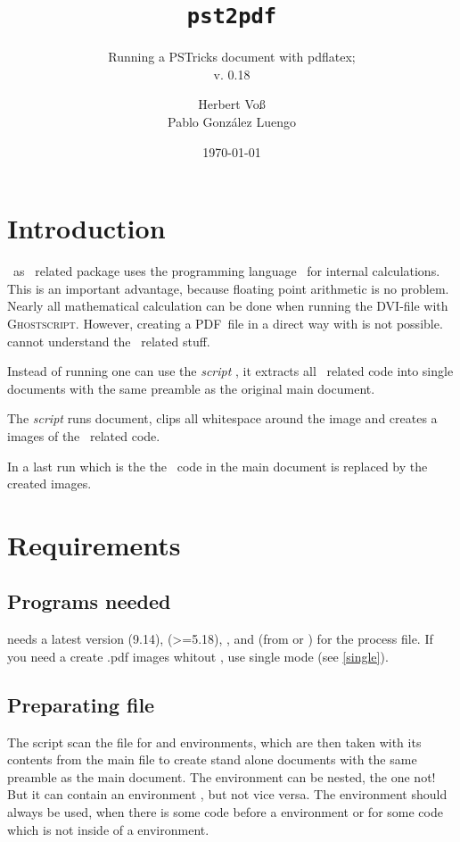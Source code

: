 \documentclass[11pt,english,BCOR=10mm,DIV=12,bibliography=totoc,parskip=false,headings=small,
    headinclude=false,footinclude=false,twoside]{pst-doc}
\def\DVI{\textsc{DVI}}
\def\PDF{\textsc{PDF}}
\def\gs{\textsc{Ghostscript}}
\begin{document}
\title{\texttt{pst2pdf}}
\subtitle{Running a PSTricks document with pdflatex;\\  \small v. 0.18}
\author{Herbert Voß  \\ Pablo Gonz\'{a}lez Luengo}
\docauthor{}
\date{\today}
\maketitle

\tableofcontents

\clearpage

\section{Introduction}
\PST\ as \PS\ related package uses the programming language \PS\ for internal
calculations. This is an important advantage, because floating point arithmetic is no
problem. Nearly all mathematical calculation can be done when running the \DVI-file
with \gs. However, creating a \PDF\ file in a direct way with  is
not possible.  cannot understand the \PS\ related stuff.

Instead of running  one can use the  \emph{script} , it extracts
all \PST\ related code into single documents with the same preamble as the original
main document.

The  \emph{script} runs document, clips all whitespace around the
image and creates a  images of the \PST\ related code.

In a last run which is the  the \PST\ code in the
main document is replaced by the created images.

\section{Requirements}
\subsection{Programs needed}
 needs a latest version  (9.14),  (>=5.18), ,  and 
(from  or ) for the process file. If you need a create .pdf images whitout , use single mode (see \ref{single}).

\subsection{Preparating file}
The script scan the file for  and  environments,
which are then taken with its contents from the main file to create stand alone documents
with the same preamble as the main document. The  environment can be nested,
the  one not! But it can contain an environment , but not vice versa.
The  environment should always be used, when there is some code before a 
environment or for some code which is not inside of a  environment.
\end{document}
